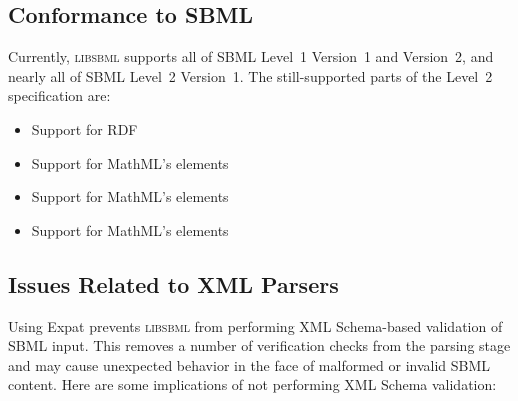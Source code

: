 \documentclass{sbmlmanual}
\newcommand{\libsbml}{\textsc{libsbml}}
\begin{document}
\subsection{Conformance to SBML}

Currently, \libsbml{} supports all of SBML Level~1 Version~1 and Version~2,
and nearly all of SBML Level~2 Version~1.  The still-supported parts of
the Level~2 specification are:

\begin{itemize}\setlength{\parskip}{-0.25ex}
\item Support for RDF
\item Support for MathML's  elements
\item Support for MathML's  elements
\item Support for MathML's  elements
\end{itemize}


\subsection{Issues Related to XML Parsers}
\label{sec:issues-about-parsers}

Using Expat prevents \libsbml{} from performing XML Schema-based validation
of SBML input.  This removes a number of verification checks from the
parsing stage and may cause unexpected behavior in the face of malformed or
invalid SBML content.  Here are some implications of not performing XML
Schema validation:
\end{document}
